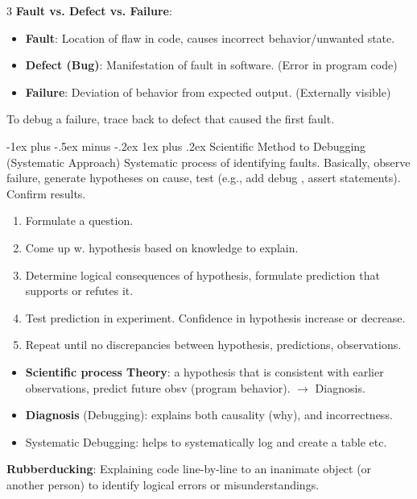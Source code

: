 \documentclass[a4paper, 10pt, landscape]{article}
\makeatletter
\renewcommand{\subsubsection}{\@startsection{subsubsection}{3}{0mm}%
                                {-1ex plus -.5ex minus -.2ex}%
                                {1ex plus .2ex}%
                                {\normalfont\small\bfseries}}
\makeatother
\begin{document}
\begin{multicols*}{3}
\textbf{Fault vs. Defect vs. Failure}:
\begin{itemize}[itemsep=-1pt]
\item \textbf{Fault}: Location of flaw in code, causes incorrect behavior/unwanted state.
\item \textbf{Defect (Bug)}: Manifestation of fault in software. (Error in program code)
\item \textbf{Failure}: Deviation of behavior from expected output. (Externally visible)
\end{itemize}
To debug a failure, trace back to defect that caused the first fault.


\subsubsection{Scientific Method to Debugging (Systematic Approach)}
Systematic process of identifying faults. Basically, observe failure, generate hypotheses on cause, test (e.g., add debug , assert statements). Confirm results.
\begin{enumerate}[itemsep=-1.5pt]
\item Formulate a question.
\item Come up w. hypothesis based on knowledge to explain.
\item Determine logical consequences of hypothesis, formulate prediction that supports or refutes it. 
\item Test prediction in experiment. Confidence in hypothesis increase or decrease.
\item Repeat until no discrepancies between hypothesis, predictions, observations.
\end{enumerate}
\begin{itemize}
\item \textbf{Scientific process Theory}: a hypothesis that is consistent with earlier observations, predict future obsv (program behavior). $\rightarrow$ Diagnosis.
\item \textbf{Diagnosis} (Debugging): explains both causality (why), and incorrectness. 
\item Systematic Debugging:  helps to systematically log and create a table etc. 
\end{itemize}
\textbf{Rubberducking}: Explaining code line-by-line to an inanimate object (or another person) to identify logical errors or misunderstandings.


\end{multicols*}
\end{document}
